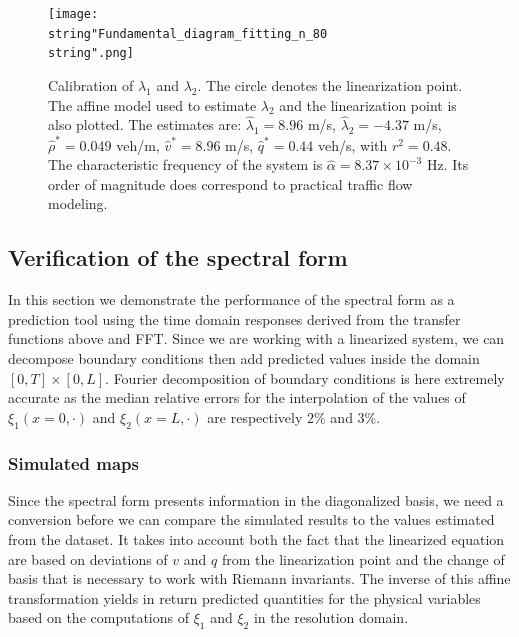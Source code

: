 \documentclass[a4paper, 10pt, conference]{ieeeconf}      %
\begin{document}
\begin{figure}[H]
\centering
\texttt{[image: \\string"Fundamental\_diagram\_fitting\_n\_80\\string".png]}
\protect\caption{Calibration of $\lambda_{1}$ and $\lambda_{2}$. The circle denotes the linearization point. The affine model used to estimate $\lambda_{2}$ and the linearization point is also plotted. The estimates are: $\widehat{\lambda}_{1}=8.96$ m/s, $\widehat{\lambda}_{2}=-4.37$ m/s, $\widehat{\rho}^{*}=0.049$ veh/m, $\widehat{v}^{*}=8.96$ m/s, $\widehat{q}^{*}=0.44$ veh/s, with $r^{2}=0.48$. The characteristic frequency of the system is $\widehat{\alpha} = 8.37\times10^{-3}$ Hz. Its order of magnitude does correspond to practical traffic flow modeling.}
\label{fig:Calibration-of-eigen-values}
\end{figure}

\subsection{Verification of the spectral form}
In this section we demonstrate the performance of the spectral form as a prediction tool using the time domain responses derived from the transfer functions above and FFT. Since we are working with a linearized system, we can decompose boundary conditions then add predicted values inside the domain $\left[0,T\right]\times\left[0,L\right]$. Fourier decomposition of boundary conditions is here extremely accurate as the median relative errors for the interpolation of the values of $\xi_{1}\left(x=0, \cdot \right)$ and $\xi_{2}\left(x=L, \cdot \right)$ are respectively $2\%$ and $3\%$.\\

\subsubsection{Simulated maps}
Since the spectral form presents information in the diagonalized basis, we need a conversion before we can compare the simulated results to the values estimated from the dataset. It takes into account both the fact that the linearized equation are based on deviations of $v$ and $q$ from the linearization point and the change of basis that is necessary to work with Riemann invariants. The inverse of this affine transformation yields in return predicted quantities for the physical variables based on the computations of $\xi_1$ and $\xi_2$ in the resolution domain.
\end{document}
